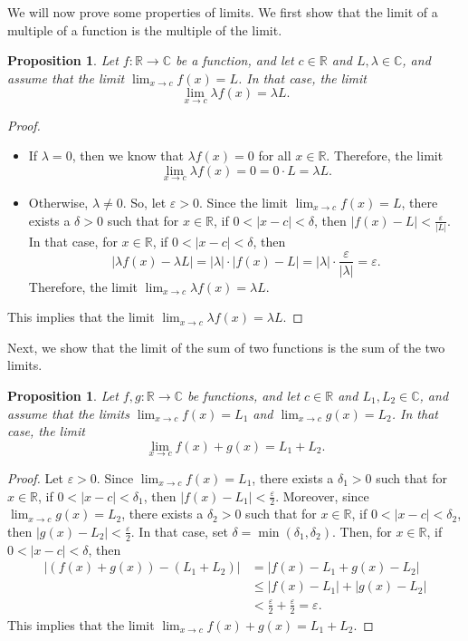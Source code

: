\documentclass[a4paper, openany]{memoir}
\theoremstyle{definition}
\theoremstyle{plain}
\newtheorem{proposition}[definition]{Proposition}
\begin{document}
We will now prove some properties of limits. We first show that the limit of a multiple of a function is the multiple of the limit.
\begin{proposition}
Let $f: \mathbb{R} \to \mathbb{C}$ be a function, and let $c \in \mathbb{R}$ and $L, \lambda \in \mathbb{C}$, and assume that the limit $\lim_{x \to c} f(x) = L$. In that case, the limit 
\[\lim_{x \to c} \lambda f(x) = \lambda L.\]
\end{proposition}
\begin{proof}
\hspace*{0pt}
\begin{itemize}
    \item If $\lambda = 0$, then we know that $\lambda f(x) = 0$ for all $x \in \mathbb{R}$. Therefore, the limit
    \[\lim_{x \to c} \lambda f(x) = 0 = 0 \cdot L = \lambda L.\]
    \item Otherwise, $\lambda \neq 0$. So, let $\varepsilon > 0$. Since the limit $\lim_{x \to c} f(x) = L$, there exists a $\delta > 0$ such that for $x \in \mathbb{R}$, if $0 < |x - c| < \delta$, then $|f(x) - L| < \frac{\varepsilon}{|L|}$. In that case, for $x \in \mathbb{R}$, if $0 < |x - c| < \delta$, then
    \[|\lambda f(x) - \lambda L| = |\lambda| \cdot |f(x) - L| = |\lambda| \cdot \frac{\varepsilon}{|\lambda|} = \varepsilon.\]
    Therefore, the limit $\lim_{x \to c} \lambda f(x) = \lambda L$.
\end{itemize}
This implies that the limit $\lim_{x \to c} \lambda f(x) = \lambda L$.
\end{proof}
\noindent Next, we show that the limit of the sum of two functions is the sum of the two limits.
\begin{proposition}
Let $f, g: \mathbb{R} \to \mathbb{C}$ be functions, and let $c \in \mathbb{R}$ and $L_1, L_2 \in \mathbb{C}$, and assume that the limits $\lim_{x \to c} f(x) = L_1$ and $\lim_{x \to c} g(x) = L_2$. In that case, the limit 
\[\lim_{x \to c} f(x) + g(x) = L_1 + L_2.\]
\end{proposition}
\begin{proof}
Let $\varepsilon > 0$. Since $\lim_{x \to c} f(x) = L_1$, there exists a $\delta_1 > 0$ such that for $x \in \mathbb{R}$, if $0 < |x - c| < \delta_1$, then $|f(x) - L_1| < \frac{\varepsilon}{2}$. Moreover, since $\lim_{x \to c} g(x) = L_2$, there exists a $\delta_2 > 0$ such that for $x \in \mathbb{R}$, if $0 < |x - c| < \delta_2$, then $|g(x) - L_2| < \frac{\varepsilon}{2}$. In that case, set $\delta = \min(\delta_1, \delta_2)$. Then, for $x \in \mathbb{R}$, if $0 < |x - c| < \delta$, then
\begin{align*}
    |(f(x) + g(x)) - (L_1 + L_2)| &= |f(x) - L_1 + g(x) - L_2| \\
    &\leqslant |f(x) - L_1| + |g(x) - L_2| \\
    &< \frac{\varepsilon}{2} + \frac{\varepsilon}{2} = \varepsilon. 
\end{align*}
This implies that the limit $\lim_{x \to c} f(x) + g(x) = L_1 + L_2$.
\end{proof}
\end{document}
